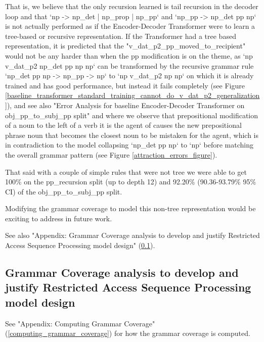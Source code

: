 \documentclass[11pt]{article}
\begin{document}
That is, we believe that the only recursion learned is tail recursion in the decoder loop and that `np -> np\_det | np\_prop | np\_pp` and `np\_pp -> np\_det pp np` is not actually performed as if the Encoder-Decoder Transformer were to learn a tree-based or recursive representation. If the Transformer had a tree based representation, it is predicted that the "v\_dat\_p2\_pp\_moved\_to\_recipient" would not be any harder than when the pp modification is on the theme, as `np v\_dat\_p2 np\_det pp np np` can be transformed by the recursive grammar rule `np\_det pp np -> np\_pp -> np` to `np v\_dat\_p2 np np` on which it is already trained and has good performance, but instead it fails completely (see Figure \ref{baseline_transformer_standard_training_cannot_do_v_dat_p2_generalization}), and see also "Error Analysis for \citep{Wu2023} baseline Encoder-Decoder Transformer on obj\_pp\_to\_subj\_pp split" and where we observe that prepositional modification of a noun to the left of a verb it is the agent of causes the new prepositional phrase noun that becomes the closest noun to be mistaken for the agent, which is in contradiction to the model collapsing `np\_det pp np` to `np` before matching the overall grammar pattern (see Figure \ref{attraction_errors_figure}).

That said with a couple of simple rules that were not tree we were able to get 100\% on the pp\_recursion split (up to depth 12) and 92.20\% (90.36-93.79\% 95\% CI) of the obj\_pp\_to\_subj\_pp split.

Modifying the grammar coverage to model this non-tree representation would be exciting to address in future work.

See also "Appendix: Grammar Coverage analysis to develop and justify Restricted Access Sequence Processing model design" (\ref{grammar_coverage_analysis_for_model_design}).

\subsection{Grammar Coverage analysis to develop and justify Restricted Access Sequence Processing model design}
\label{grammar_coverage_analysis_for_model_design}

See "Appendix: Computing Grammar Coverage" (\ref{computing_grammar_coverage}) for how the grammar coverage is computed.
\end{document}
